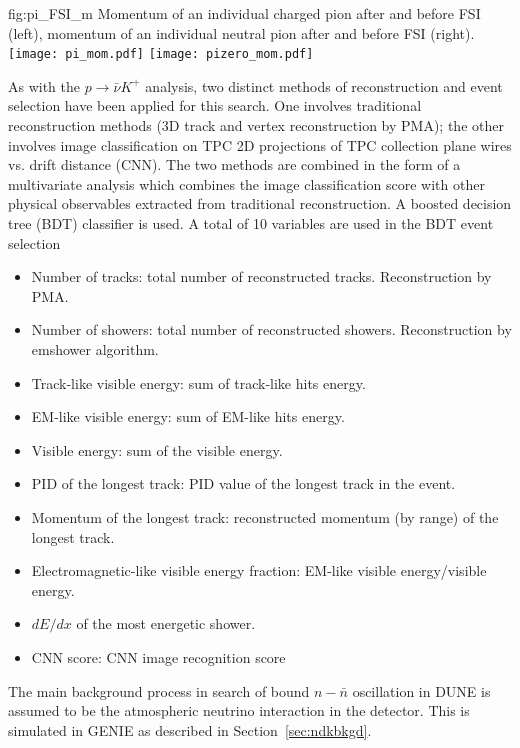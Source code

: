 \begin{dunefigure}
{fig:pi_FSI_m}
{Momentum of an individual charged pion after and before FSI (left), momentum of an individual neutral pion after and before FSI (right).}
\texttt{[image: pi\_mom.pdf]}
\texttt{[image: pizero\_mom.pdf]}
\end{dunefigure} 

As with the $p\rightarrow \bar{\nu} K^{+}$ analysis, two distinct methods of reconstruction and event selection have been applied for this search. One involves traditional reconstruction methods (3D track and vertex reconstruction by PMA); the other involves image classification on TPC 2D projections of TPC collection plane wires vs. drift distance (CNN). The two methods are combined in the form of a multivariate analysis which combines the image classification score with other physical observables extracted from traditional reconstruction.  A boosted decision tree (BDT) classifier is used. A total of 10 variables are used in the BDT event selection
 \begin{itemize}
  \item Number of tracks: total number of reconstructed tracks. Reconstruction by PMA.
  \item Number of showers: total number of reconstructed showers. Reconstruction by emshower algorithm. 
  \item Track-like visible energy: sum of track-like hits energy.
  \item EM-like visible energy: sum of EM-like hits energy.
  \item Visible energy: sum of the visible energy.
  \item PID of the longest track: PID value of the longest track in the event.
  \item Momentum of the longest track: reconstructed momentum (by range) of the longest track.
  \item Electromagnetic-like visible energy fraction: EM-like visible energy/visible energy.
  \item $dE/dx$ of the most energetic shower. 
  \item CNN score: CNN image recognition score
 \end{itemize}

The main background process in search of bound $n-\bar{n}$ oscillation in DUNE is assumed to be the atmospheric neutrino interaction in the detector.  This is simulated in GENIE as described in Section~\ref{sec:ndkbkgd}.

